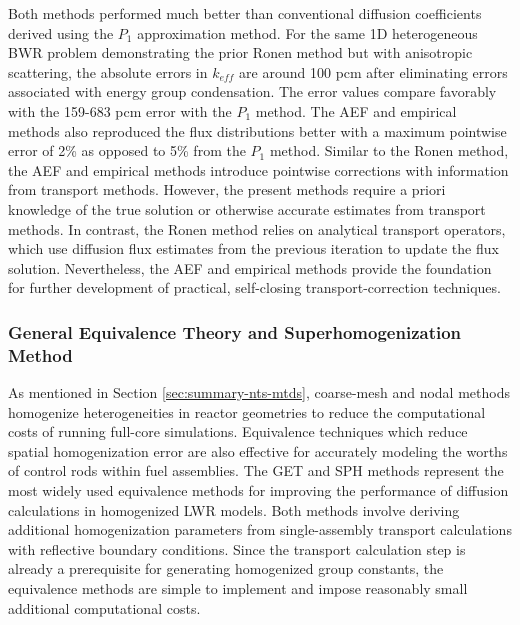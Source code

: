 Both methods performed much better than conventional diffusion coefficients derived using the
$P_1$ approximation method. For the same 1D heterogeneous \gls{BWR} problem demonstrating the prior
Ronen method \cite{gross_high-accuracy_2020} but with anisotropic scattering, the absolute errors
in $k_{eff}$ are around 100 pcm after eliminating errors associated with energy group
condensation. The error values compare favorably with the 159-683 pcm error with the $P_1$ method.
The \gls{AEF} and empirical methods also reproduced the flux distributions better with a maximum
pointwise error of 2\% as opposed to 5\% from the $P_1$ method. Similar to the Ronen method, the
\gls{AEF} and empirical methods introduce pointwise corrections with information from transport
methods. However, the present methods require a priori knowledge of the true solution or otherwise
accurate estimates from transport methods. In contrast, the Ronen method relies on analytical
transport operators, which use diffusion flux estimates from the previous iteration to update the
flux solution. Nevertheless, the \gls{AEF} and empirical methods provide the foundation for further
development of practical, self-closing transport-correction techniques.

\subsubsection{General Equivalence Theory and Superhomogenization Method}

As mentioned in Section \ref{sec:summary-nts-mtds}, coarse-mesh and nodal methods homogenize
heterogeneities in reactor geometries to reduce the computational costs of running full-core
simulations. Equivalence techniques which reduce spatial homogenization error are also effective
for accurately modeling the worths of control rods within fuel assemblies. The \gls{GET}
\cite{koebke_new_1980, smith_nodal_1983} and \gls{SPH} \cite{kavenoky_sph_1978,
hebert_consistent_1991} methods represent the most widely used equivalence methods for improving
the performance of diffusion calculations in homogenized \gls{LWR} models. Both methods involve
deriving additional homogenization parameters from single-assembly transport calculations with
reflective boundary conditions. Since the transport calculation step is already a prerequisite
for generating homogenized group constants, the equivalence methods are simple to implement and
impose reasonably small additional computational costs.


